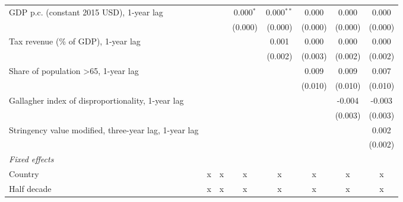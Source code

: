 \begin{table}[htbp]
\begin{tabular}{lccccccc}
      GDP p.c. (constant 2015 USD), 1-year lag                           &                &               & 0.000$^{*}$    & 0.000$^{**}$  & 0.000         & 0.000         & 0.000\\   
                                                                         &                &               & (0.000)        & (0.000)       & (0.000)       & (0.000)       & (0.000)\\   
      Tax revenue (\% of GDP), 1-year lag                                &                &               &                & 0.001         & 0.000         & 0.000         & 0.000\\   
                                                                         &                &               &                & (0.002)       & (0.003)       & (0.002)       & (0.002)\\   
      Share of population >65, 1-year lag                                &                &               &                &               & 0.009         & 0.009         & 0.007\\   
                                                                         &                &               &                &               & (0.010)       & (0.010)       & (0.010)\\   
      Gallagher index of disproportionality, 1-year lag                  &                &               &                &               &               & -0.004        & -0.003\\   
                                                                         &                &               &                &               &               & (0.003)       & (0.003)\\   
      Stringency value modified, three-year lag, 1-year lag              &                &               &                &               &               &               & 0.002\\   
                                                                         &                &               &                &               &               &               & (0.002)\\   
      \emph{Fixed effects}\\
      Country                                                            & x              & x             & x              & x             & x             & x             & x\\  
      Half decade                                                        & x              & x             & x              & x             & x             & x             & x\\  

\end{tabular}
\end{table}

